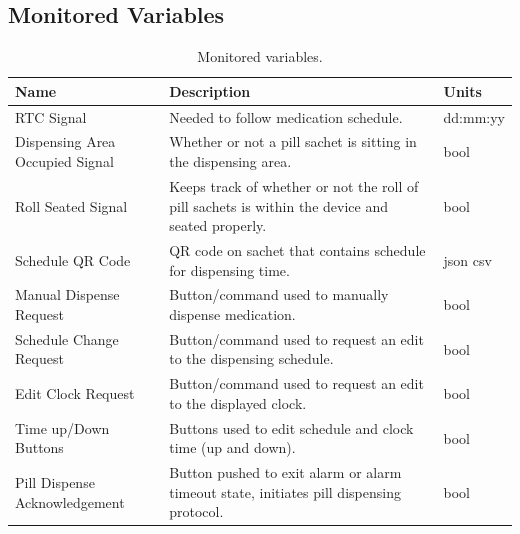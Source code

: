 \documentclass[12pt,titlepage]{article}
\begin{document}
\subsection{Monitored Variables}
\begin{table}[!htbp]
\begin{center}
\begin{adjustbox}{max width=\textwidth}
\small
\begin{tabular}{|p{}|p{}|p{}|}
 \hline
 \textbf{Name} & \textbf{Description} & \textbf{Units}\\
 \hline 
RTC Signal & Needed to follow medication schedule. & dd:mm:yy\\
 \hline
Dispensing Area \newline Occupied Signal & Whether or not a pill sachet is sitting in the dispensing area. & bool\\
 \hline
 Roll Seated Signal & Keeps track of whether or not the roll of pill sachets is within the device and seated properly. & bool\\
 \hline
  Schedule QR Code & QR code on sachet that contains schedule for dispensing time. & json \newline csv \\
 \hline
Manual Dispense Request & Button/command used to manually dispense medication. & bool \\
  \hline
  Schedule Change Request & Button/command used to request an edit to the dispensing schedule. & bool \\
  \hline
    Edit Clock Request & Button/command used to request an edit to the displayed clock. & bool \\
  \hline
   Time up/Down Buttons & Buttons used to edit schedule and clock time (up and down). & bool \\
  \hline
  Pill Dispense Acknowledgement & Button pushed to exit alarm or alarm timeout state, initiates pill dispensing protocol. & bool \\
  \hline

\end{tabular}
\end{adjustbox}
\end{center}
\caption{Monitored variables.}
\end{table}
\end{document}
